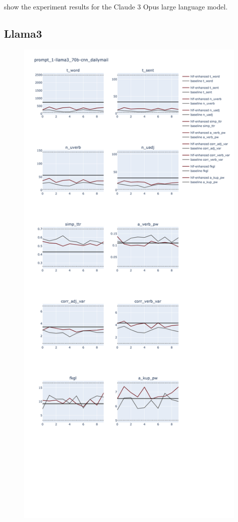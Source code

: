 \documentclass[a4paper,twoside]{article}
\begin{document}
show the experiment results for the Claude 3 Opus large language model.

\subsection{Llama3}

\begin{figure}[ht]
    \includegraphics[width=\textwidth,height=0.9\textheight,scale=1]{plots/prompt_1/prompt_1-llama3_70b-cnn_dailymail/prompt_1-llama3_70b-cnn_dailymail.png}

\end{figure}
\end{document}
